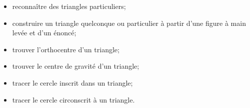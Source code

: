 \begin{acquis}
\begin{itemize}
\item reconnaître des triangles particuliers;
\item construire un triangle quelconque ou particulier à partir d'une figure à main levée et d'un énoncé;
\item trouver l'orthocentre d'un triangle;
\item trouver le centre de gravité d'un triangle;
\item tracer le cercle inscrit dans un triangle;
\item tracer le cercle circonscrit à un triangle.
\end{itemize}
\end{acquis}

  
